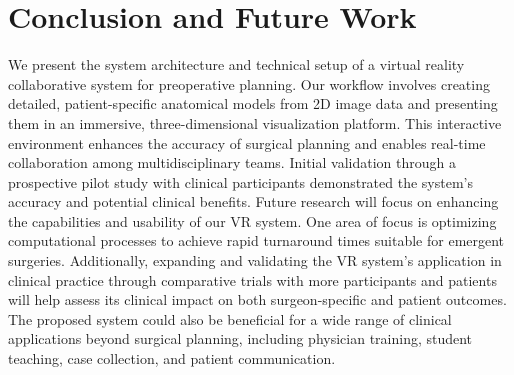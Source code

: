 \documentclass{bmcart}
\begin{document}
\section{Conclusion and Future Work}
We present the system architecture and technical setup of a virtual reality collaborative system for preoperative planning. Our workflow involves creating detailed, patient-specific anatomical models from 2D image data and presenting them in an immersive, three-dimensional visualization platform. This interactive environment enhances the accuracy of surgical planning and enables real-time collaboration among multidisciplinary teams. Initial validation through a prospective pilot study with clinical participants demonstrated the system's accuracy and potential clinical benefits.
Future research will focus on enhancing the capabilities and usability of our VR system. One area of focus is optimizing computational processes to achieve rapid turnaround times suitable for emergent surgeries. Additionally, expanding and validating the VR system's application in clinical practice through comparative trials with more participants and patients will help assess its clinical impact on both surgeon-specific and patient outcomes. The proposed system could also be beneficial for a wide range of clinical applications beyond surgical planning, including physician training, student teaching, case collection, and patient communication.


\end{document}
